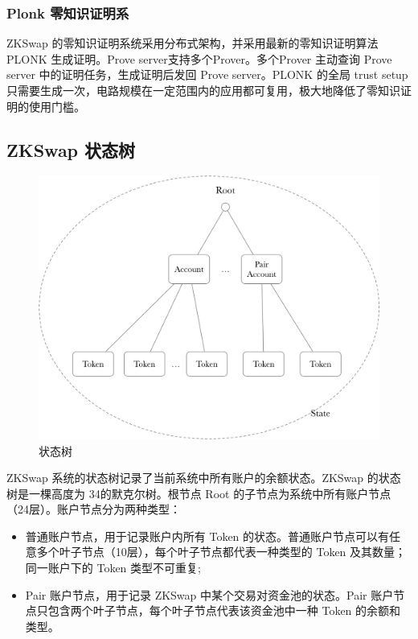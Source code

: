 \documentclass[]{template/llncs}
\begin{document}
\subsubsection{Plonk 零知识证明系}

ZKSwap 的零知识证明系统采用分布式架构，并采用最新的零知识证明算法 PLONK\cite{cryptoeprint:2019:953} 生成证明。Prove server支持多个Prover。多个Prover 主动查询 Prove server 中的证明任务，生成证明后发回 Prove server。PLONK 的全局 trust setup只需要生成一次，电路规模在一定范围内的应用都可复用，极大地降低了零知识证明的使用门槛。

\subsection{ZKSwap 状态树}

\begin{figure}[htbp]
\centering
\includegraphics[width=0.9\columnwidth]{figure/state}
\caption{状态树}
\label{fig:state}
\end{figure}

ZKSwap 系统的状态树记录了当前系统中所有账户的余额状态。ZKSwap 的状态树是一棵高度为 34的默克尔树。根节点 Root 的子节点为系统中所有账户节点（24层）。账户节点分为两种类型：

\begin{itemize}
	\item 普通账户节点，用于记录账户内所有 Token 的状态。普通账户节点可以有任意多个叶子节点（10层），每个叶子节点都代表一种类型的 Token 及其数量；同一账户下的 Token 类型不可重复;
	\item Pair 账户节点，用于记录 ZKSwap 中某个交易对资金池的状态。Pair 账户节点只包含两个叶子节点，每个叶子节点代表该资金池中一种 Token 的余额和类型。
\end{itemize}
\end{document}
